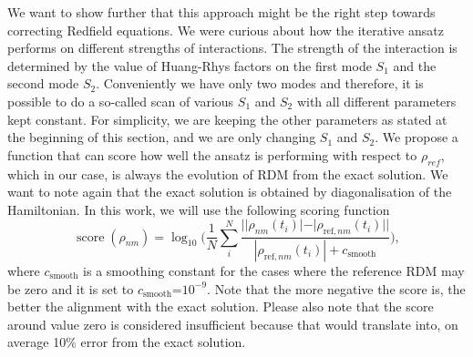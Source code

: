 We want to show further that this approach might be the right step towards correcting Redfield equations. We were curious about how the iterative ansatz performs on different strengths of interactions. The strength of the interaction is determined by the value of Huang-Rhys factors on the first mode $S_1$ and the second mode $S_2$. Conveniently we have only two modes and therefore, it is possible to do a so-called scan of various $S_1$ and $S_2$ with all different parameters kept constant. For simplicity, we are keeping the other parameters as stated at the beginning of this section, and we are only changing $S_1$ and $S_2$. We propose a function that can score how well the ansatz is performing with respect to $\rho_{ref}$, which in our case, is always the evolution of RDM from the exact solution. We want to note again that the exact solution is obtained by diagonalisation of the Hamiltonian. In this work, we will use the following scoring function
\begin{equation}
\label{score_fun}
    \operatorname{score}(\rho_{nm}) = \log_{10} \Big( \frac{1}{N}\sum_i^N \frac{||\rho_{nm}(t_i)| - |\rho_{\mathrm{ref},nm}(t_i)||}{|\rho_{\mathrm{ref},nm}(t_i)| + c_{\mathrm{smooth}}} \Big),
\end{equation}
where $c_{\mathrm{smooth}}$ is a smoothing constant for the cases where the reference RDM may be zero and it is set to $c_{\mathrm{smooth}}$=$10^{-9}$. Note that the more negative the score is, the better the alignment with the exact solution. Please also note that the score around value zero is considered insufficient because that would translate into, on average 10\% error from the exact solution. 

